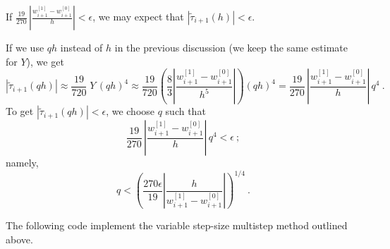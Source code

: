 If $\displaystyle \frac{19}{270}\,
\left| \frac{w_{i+1}^{[1]} - w_{i+1}^{[0]}}{h}\right| < \epsilon$,
we may expect that
$\left| \tilde{\tau}_{i+1}(h) \right| < \epsilon$.

If we use $qh$ instead of $h$ in the previous discussion (we keep the
same estimate for $Y$), we get
\[
\left| \tilde{\tau}_{i+1}(qh) \right| \approx
\frac{19}{720}\; Y\,(qh)^4 \approx
\frac{19}{720}\left( \frac{8}{3}
\left| \frac{w_{i+1}^{[1]} - w_{i+1}^{[0]}}{h^5} \right| \right) (qh)^4 =
\frac{19}{270}\,\left| \frac{w_{i+1}^{[1]} - w_{i+1}^{[0]}}{h}\right|\,q^4
\ . \]
To get $\left| \tilde{\tau}_{i+1}(qh) \right| < \epsilon$, we choose
$q$ such that
\[
\frac{19}{270}\,\left|\frac{w_{i+1}^{[1]} - w_{i+1}^{[0]}}{h}\right|\,q^4
< \epsilon \ ;
\]
namely,
\[
q < \left( \frac{270\epsilon}{19}\left|
\frac{h}{w_{i+1}^{[1]} - w_{i+1}^{[0]}}
\right|\right)^{1/4} \ .
\]

The following code implement the variable step-size multistep method
outlined above.

